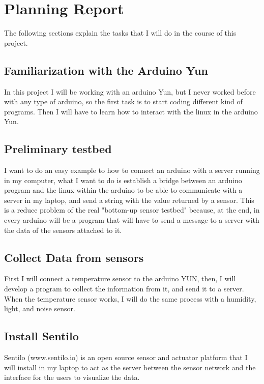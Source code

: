 \section{Planning Report}

The following sections explain the tasks that I will do in the course of this project.

\subsection{Familiarization with the Arduino Yun}

In this project I will be working with an arduino Yun, but I never worked before with any type of arduino, so the first task is to start coding different kind of programs. Then I will have to learn how to interact with the linux in the arduino Yun.

\subsection{Preliminary testbed}

I want to do an easy example to how to connect an arduino with a server running in my computer, what I want to do is establish a bridge between an arduino program and the linux within the arduino to be able to communicate with a server in my laptop, and send a string with the value returned by a sensor.
This is a reduce problem of the real "bottom-up sensor testbed" because, at the end, in every arduino will be a program that will have to send a message to a server with the data of the sensors attached to it.

\subsection{Collect Data from sensors}

First I will connect a temperature sensor to the arduino YUN, then, I will develop a program to collect the information from it, and send it to a server.
When the temperature sensor works, I will do the same process with a humidity, light, and noise sensor.

\subsection{Install Sentilo}

Sentilo (www.sentilo.io) is an open source sensor and actuator platform that I will install in my laptop to act as the server between the sensor network and the interface for the users to visualize the data. 

